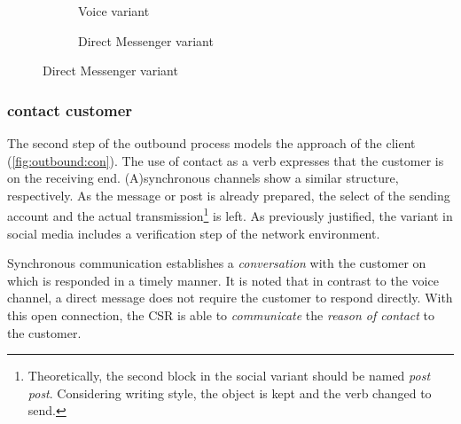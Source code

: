 \begin{figure}[caption={prepare contact detail process}, label={fig:outbound:prep}]
\begin{subfigure}[b]{.45\textwidth}
\begin{tikzpicture}
	 		\end{tikzpicture}
	 		\caption{Voice variant}\label{fig:outbound:prep:voice}
	 	\end{subfigure}
	 	\begin{subfigure}[b]{.45\textwidth}
	 		\centering	
	 		\caption{Direct Messenger variant}\label{fig:outbound:prep:dm}
	 	\end{subfigure}
	 \end{figure}
	 
	 
	 \subsubsection{contact customer}
	 
	 The second step of the outbound process models the approach of the client (\Fig \ref{fig:outbound:con}). The use of contact as a verb expresses that the customer is on the receiving end. (A)synchronous channels show a similar structure, respectively. As the message or post is already prepared, the select of the sending account and the actual transmission\footnote{Theoretically, the second block in the social variant should be named \textit{post post}. Considering writing style, the object is kept and the verb changed to send. } is left. As previously justified, the variant in social media includes a verification step of the network environment. 
	 
	 Synchronous communication establishes a \textit{conversation} with the customer on which is responded in a timely manner. It is noted that in contrast to the voice channel, a direct message does not require the customer to respond directly. With this open connection, the  \acrshort{CSR} is able to \textit{communicate} the \textit{reason of contact} to the customer. 
	 
